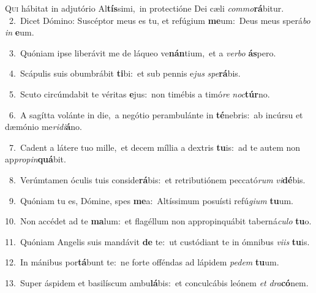 \lettrine{\initial\textcolor{\initialcolor}{Q}}{ui} hábitat in adjutório Al\-\textbf{tís}\-simi,~\star in protectióne Dei cæli \textit{com}\-\textit{mo}\textbf{rá}bitur.\\
{\numbfont\textcolor{\numbcolor}{~2.}}~Dicet Dómino: Suscéptor meus es tu, et refúgium \textbf{me}\-um:~\star Deus meus sperá\textit{bo} \textit{in} \textbf{e}\-um.\par
{\numbfont\textcolor{\numbcolor}{~3.}}~Quóniam ipse liberávit me de láqueo ve\-\textbf{nán}\-tium,~\star et a \textit{ver}\-\textit{bo} \textbf{ás}\-pero.\par
{\numbfont\textcolor{\numbcolor}{~4.}}~Scápulis suis obumbrábit \textbf{ti}\-bi:~\star et sub pennis e\textit{jus} \textit{spe}\-\textbf{rá}bis.\par
{\numbfont\textcolor{\numbcolor}{~5.}}~Scuto circúmdabit te véritas \textbf{e}\-jus:~\star non timébis a timó\textit{re} \textit{noc}\-\textbf{túr}no.\par
{\numbfont\textcolor{\numbcolor}{~6.}}~A sagítta volánte in die,~\dagger a negótio perambulánte in \textbf{té}\-nebris:~\star ab incúrsu et dæmónio me\-\textit{ri}\-\textit{di}\textbf{á}no.\par
{\numbfont\textcolor{\numbcolor}{~7.}}~Cadent a látere tuo mille,~\dagger et decem míllia a dextris \textbf{tu}\-is:~\star ad te autem non ap\-\textit{pro}\-\textit{pin}\textbf{quá}bit.\par
{\numbfont\textcolor{\numbcolor}{~8.}}~Verúmtamen óculis tuis conside\-\textbf{rá}\-bis:~\star et retributiónem peccató\textit{rum} \textit{vi}\-\textbf{dé}bis.\par
{\numbfont\textcolor{\numbcolor}{~9.}}~Quóniam tu es, Dómine, spes \textbf{me}\-a:~\star Altíssimum posuísti refú\-\textit{gi}\-\textit{um} \textbf{tu}\-um.\par
{\numbfont\textcolor{\numbcolor}{10.}}~Non accédet ad te \textbf{ma}\-lum:~\star et flagéllum non appropinquábit taberná\-\textit{cu}\-\textit{lo} \textbf{tu}\-o.\par
{\numbfont\textcolor{\numbcolor}{11.}}~Quóniam Angelis suis mandávit \textbf{de} te:~\star ut custódiant te in ómnibus \textit{vi}\-\textit{is} \textbf{tu}\-is.\par
{\numbfont\textcolor{\numbcolor}{12.}}~In mánibus por\-\textbf{tá}\-bunt te:~\star ne forte offéndas ad lápidem \textit{pe}\-\textit{dem} \textbf{tu}\-um.\par
{\numbfont\textcolor{\numbcolor}{13.}}~Super áspidem et basilíscum ambu\-\textbf{lá}\-bis:~\star et conculcábis leónem \textit{et} \textit{dra}\-\textbf{có}nem.\par
